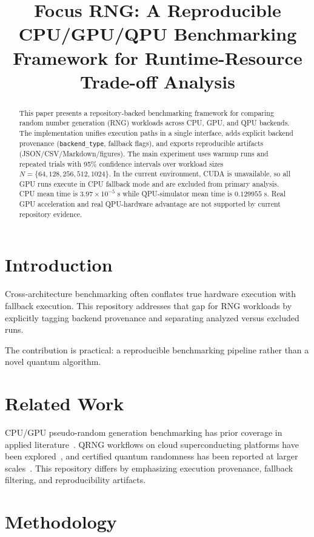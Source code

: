 \documentclass[10pt,conference]{IEEEtran}
\title{Focus RNG: A Reproducible CPU/GPU/QPU Benchmarking Framework for Runtime-Resource Trade-off Analysis}
\author{\IEEEauthorblockN{Anonymous for Review}}
\begin{document}
\maketitle

\begin{abstract}
This paper presents a repository-backed benchmarking framework for comparing random number generation (RNG) workloads across CPU, GPU, and QPU backends. The implementation unifies execution paths in a single interface, adds explicit backend provenance (\texttt{backend\_type}, fallback flags), and exports reproducible artifacts (JSON/CSV/Markdown/figures). The main experiment uses warmup runs and repeated trials with 95\% confidence intervals over workload sizes $N=\{64,128,256,512,1024\}$. In the current environment, CUDA is unavailable, so all GPU runs execute in CPU fallback mode and are excluded from primary analysis. CPU mean time is $3.97\times10^{-5}$ s while QPU-simulator mean time is $0.129955$ s. Real GPU acceleration and real QPU-hardware advantage are not supported by current repository evidence.
\end{abstract}

\section{Introduction}
Cross-architecture benchmarking often conflates true hardware execution with fallback execution. This repository addresses that gap for RNG workloads by explicitly tagging backend provenance and separating analyzed versus excluded runs.

The contribution is practical: a reproducible benchmarking pipeline rather than a novel quantum algorithm.

\section{Related Work}
CPU/GPU pseudo-random generation benchmarking has prior coverage in applied literature~\cite{askar2021gpu}. QRNG workflows on cloud superconducting platforms have been explored~\cite{li2021cloudqrng}, and certified quantum randomness has been reported at larger scales~\cite{nature2025certified}. This repository differs by emphasizing execution provenance, fallback filtering, and reproducibility artifacts.

\section{Methodology}
\end{document}
